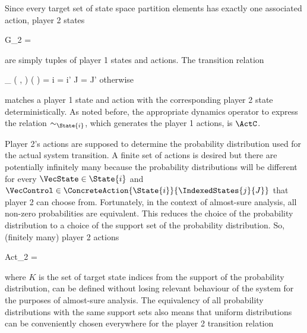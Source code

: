     Since every target set of state space partition elements has exactly one associated action, player 2 states

    \startformula
        G_2 =  \EndComma
    \stopformula

    are simply tuples of player 1 states and actions.
    The transition relation

    \startformula
        \Transition_\GameGraph
            \Big( ,  \Big)
            \Big(  \Big)
        = \startmathcases
            \MC \startgathered
                    \NC \StartIf i = i' \MidAnd J = J'
                    \NR
                    \NC \quad \MidAnd {} \neq \emptyset
                    \NR
                \stopgathered
            \NR
            \NC otherwise
            \NR
        \stopmathcases
    \stopformula

    matches a player 1 state and action with the corresponding player 2 state deterministically.
    As noted before, the appropriate dynamics operator to express the relation $\sim_{\State {i}}$, which generates the player 1 actions, is $\ActC$.

    Player 2's actions are supposed to determine the probability distribution used for the actual system transition.
    A finite set of actions is desired but there are potentially infinitely many because the probability distributions will be different for every $\VecState \in \State{i}$ and $\VecControl \in \ConcreteAction{\State{i}}{\IndexedStates{j}{J}}$ that player 2 can choose from.
    Fortunately, in the context of almost-sure analysis, all non-zero probabilities are equivalent. %
    This reduces the choice of the probability distribution to a choice of the support set of the probability distribution.
    So, (finitely many) player 2 actions

    \startformula
        Act_2 =  \EndComma
    \stopformula

    where $K$ is the set of target state indices from the support of the probability distribution, can be defined without losing relevant behaviour of the system for the purposes of almost-sure analysis.
    The equivalency of all probability distributions with the same support sets also means that uniform distributions can be conveniently chosen everywhere for the player 2 transition relation

